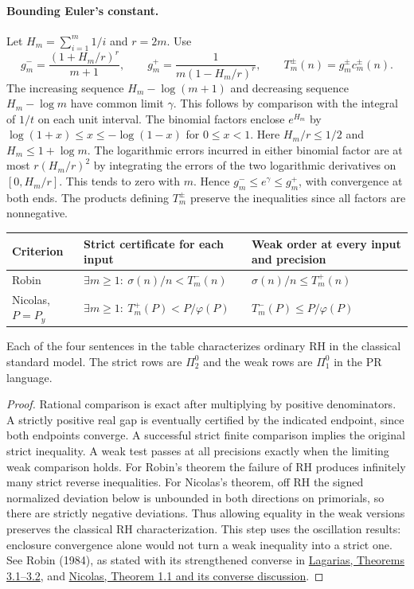 \paragraph{Bounding Euler's constant.}
Let $H_m=\sum_{i=1}^m 1/i$ and $r=2m$. Use
\[
 g^-_m=\frac{(1+H_m/r)^r}{m+1},\qquad
 g^+_m=\frac{1}{m(1-H_m/r)^r},\qquad
 T_m^\pm(n)=g_m^\pm c_m^\pm(n).
\]
The increasing sequence $H_m-\log(m+1)$ and decreasing sequence $H_m-\log m$ have common limit $\gamma$. This follows by comparison with the integral of $1/t$ on each unit interval. The binomial factors enclose $e^{H_m}$ by $\log(1+x)\le x\le-\log(1-x)$ for $0\le x<1$. Here $H_m/r\le1/2$ and $H_m\le1+\log m$. The logarithmic errors incurred in either binomial factor are at most $r(H_m/r)^2$ by integrating the errors of the two logarithmic derivatives on $[0,H_m/r]$. This tends to zero with $m$. Hence $g^-_m\le e^\gamma\le g^+_m$, with convergence at both ends. The products defining $T_m^\pm$ preserve the inequalities since all factors are nonnegative.

\begin{center}\small
\begin{tabular}{@{}lll@{}}\toprule
Criterion & Strict certificate for each input & Weak order at every input and precision\\\midrule
Robin & $\exists m\ge1:\ \sigma(n)/n<T^-_m(n)$ &
 $\sigma(n)/n\le T^+_m(n)$\\
Nicolas, $P=P_y$ & $\exists m\ge1:\ T^+_m(P)<P/\varphi(P)$ &
 $T^-_m(P)\le P/\varphi(P)$\\\bottomrule
\end{tabular}
\end{center}
\begin{theorem}
Each of the four sentences in the table characterizes ordinary RH in the classical standard model. The strict rows are $\Pi^0_2$ and the weak rows are $\Pi^0_1$ in the PR language.
\end{theorem}
\begin{proof}
Rational comparison is exact after multiplying by positive denominators. A strictly positive real gap is eventually certified by the indicated endpoint, since both endpoints converge. A successful strict finite comparison implies the original strict inequality. A weak test passes at all precisions exactly when the limiting weak comparison holds. For Robin's theorem the failure of RH produces infinitely many strict reverse inequalities. For Nicolas's theorem, off RH the signed normalized deviation below is unbounded in both directions on primorials, so there are strictly negative deviations. Thus allowing equality in the weak versions preserves the classical RH characterization. This step uses the oscillation results: enclosure convergence alone would not turn a weak inequality into a strict one. See Robin (1984), as stated with its strengthened converse in \href{https://arxiv.org/pdf/math/0008177}{Lagarias, Theorems 3.1--3.2}, and \href{https://arxiv.org/pdf/1202.0729}{Nicolas, Theorem 1.1 and its converse discussion}.
\end{proof}

